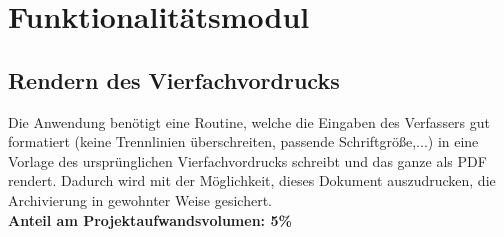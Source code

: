 \section{Funktionalitätsmodul}
\subsection{Rendern des Vierfachvordrucks}
Die Anwendung benötigt eine Routine, welche die Eingaben des Verfassers gut formatiert (keine Trennlinien überschreiten, passende Schriftgröße,...) in eine Vorlage des ursprünglichen Vierfachvordrucks schreibt und das ganze als PDF rendert. Dadurch wird mit der Möglichkeit, dieses Dokument auszudrucken, die Archivierung in gewohnter Weise gesichert.\\
\textbf{Anteil am Projektaufwandsvolumen: 5\%}